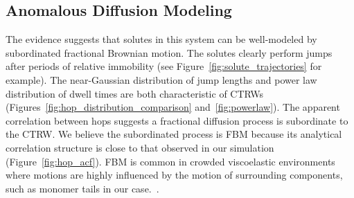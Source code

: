 \documentclass{article}
\begin{document}
%  
%  
%

  \subsection{Anomalous Diffusion Modeling}\label{section:sFBM}

  The evidence suggests
  that solutes in this system can be well-modeled by subordinated fractional
  Brownian motion. The solutes clearly perform jumps after periods of relative immobility
  (see Figure~\ref{fig:solute_trajectories} for example). The near-Gaussian distribution
  of jump lengths and power law distribution of dwell times are both characteristic of 
  CTRWs (Figures~\ref{fig:hop_distribution_comparison} and~\ref{fig:powerlaw}). The apparent
  correlation between hops suggests a fractional diffusion process is subordinate to the
  CTRW. We believe the subordinated process is FBM because its analytical correlation 
  structure is close to that observed in our simulation (Figure~\ref{fig:hop_acf}). FBM
  is common in crowded viscoelastic environments where motions are highly influenced by
  the motion of surrounding components, such as monomer tails in our case.~\cite{ernst_fractional_2012}.
  
\end{document}
